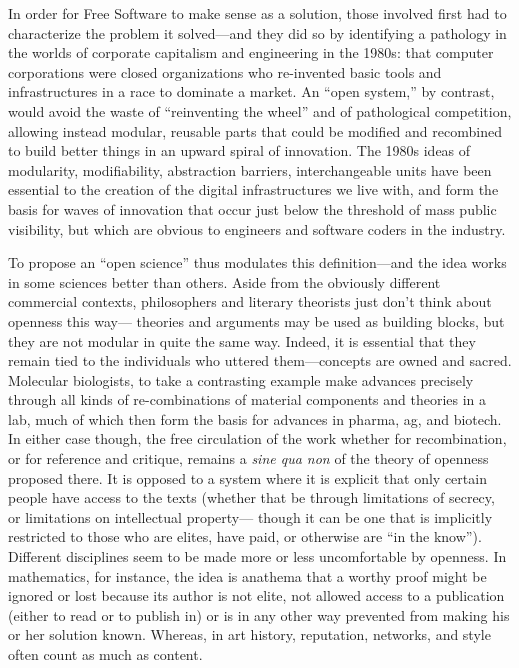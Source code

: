 \documentclass[11pt]{article}
\begin{document}
In order for Free Software to make sense as a solution, those involved first had to characterize the problem it solved---and they did so by identifying a pathology in the worlds of corporate capitalism and engineering in the 1980s: that computer corporations were closed organizations who re-invented basic tools and infrastructures in a race to dominate a market.    An ``open system,'' by contrast, would avoid the waste of ``reinventing the wheel'' and of pathological competition, allowing instead  modular, reusable parts that could be modified and recombined to build better things in an upward spiral of innovation.  The 1980s ideas of modularity, modifiability, abstraction barriers, interchangeable units have been essential to the creation of the digital infrastructures we live with, and form the basis for waves of innovation that occur just below the threshold of mass public visibility, but which are obvious to engineers and software coders in the industry. 

To propose an ``open science'' thus modulates this definition---and the idea works in some sciences better than others.  Aside from the obviously different commercial contexts, philosophers and literary theorists just don't think about openness this way--- theories and arguments may be used as building blocks, but they are not modular in quite the same way.  Indeed, it is essential that they remain tied to the individuals who uttered them---concepts are owned and sacred.  Molecular biologists, to take a contrasting example make advances precisely through all kinds of re-combinations of material components and theories in a lab, much of which then form the basis for advances in pharma, ag, and biotech.    In either case though, the free circulation of the work whether for recombination, or for reference and critique, remains a \emph{sine qua non} of the theory of openness proposed there.   It is opposed to a system where it is explicit that only certain people have access to the texts (whether that be through limitations of secrecy, or limitations on intellectual property--- though it can be one that is implicitly restricted to those who are elites, have paid, or otherwise are ``in the know'').  Different disciplines seem to be made more or less uncomfortable by openness.  In mathematics, for instance, the idea is anathema that a worthy proof might be ignored or lost because its author is not elite, not allowed access to a publication (either to read or to publish in) or is in any other way prevented from making his or her solution known. Whereas, in art history, reputation, networks, and style often count as much as content. 
\end{document}
